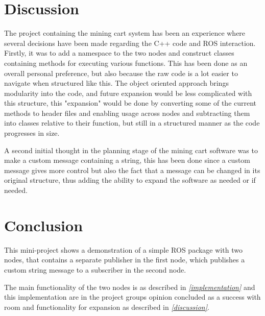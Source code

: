 \chapter{Discussion}\label{discussion}
\setlength{\parindent}{0ex}

The project containing the mining cart system has been an experience where several decisions have been made regarding the C++ code and ROS interaction. Firstly, it was to add a namespace to the two nodes and construct classes containing methods for executing various functions. This has been done as an overall personal preference, but also because the raw code is a lot easier to navigate when structured like this. The object oriented approach brings modularity into the code, and future expansion would be less complicated with this structure, this "expansion" would be done by converting some of the current methods to header files and enabling usage across nodes and subtracting them into classes relative to their function, but still in a structured manner as the code progresses in size. 

\iffalse
A note to the above:
The object oriented approach adds modularity to the code which prevents monolith coding, thus enabling the ability to easily scale the code.
\fi


\vspace{2mm}

A second initial thought in the planning stage of the mining cart software was to make a custom message containing a string, this has been done since a custom message gives more control but also the fact that a message can be changed in its original structure, thus adding the ability to expand the software as needed or if needed.

\vspace{40mm}

{\let\clearpage\relax \chapter{Conclusion}}

This mini-project shows a demonstration of a simple ROS package with two nodes, that contains a separate publisher in the first node, which publishes a custom string message to a subscriber in the second node.

The main functionality of the two nodes is as described in \textit{\autoref{implementation}} and this implementation are in the project groups opinion concluded as a success with room and functionality for expansion as described in \textit{\autoref{discussion}}.


